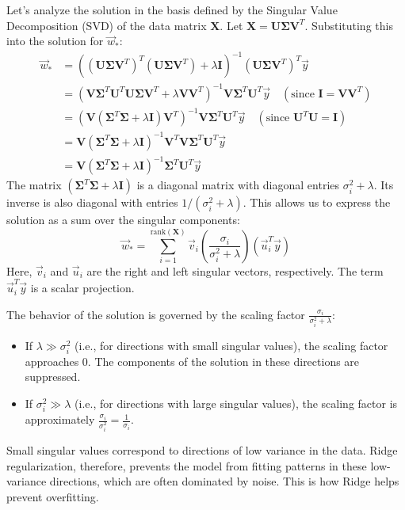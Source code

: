 \documentclass[11pt]{article}
\newcommand{\mat}[1]{\mathbf{#1}}
\begin{document}
Let's analyze the solution in the basis defined by the Singular Value Decomposition (SVD) of the data matrix $\mat{X}$. Let $\mat{X} = \mat{U} \mat{\Sigma} \mat{V}^T$. Substituting this into the solution for $\vec{w}_{*}$:
\begin{align*}
    \vec{w}_{*} &= ((\mat{U}\mat{\Sigma}\mat{V}^T)^T (\mat{U}\mat{\Sigma}\mat{V}^T) + \lambda \mat{I})^{-1} (\mat{U}\mat{\Sigma}\mat{V}^T)^T \vec{y} \\
    &= (\mat{V}\mat{\Sigma}^T\mat{U}^T \mat{U}\mat{\Sigma}\mat{V}^T + \lambda \mat{V}\mat{V}^T)^{-1} \mat{V}\mat{\Sigma}^T\mat{U}^T \vec{y} \quad (\text{since } \mat{I} = \mat{V}\mat{V}^T) \\
    &= (\mat{V}(\mat{\Sigma}^T\mat{\Sigma} + \lambda \mat{I})\mat{V}^T)^{-1} \mat{V}\mat{\Sigma}^T\mat{U}^T \vec{y} \quad (\text{since } \mat{U}^T\mat{U} = \mat{I}) \\
    &= \mat{V}(\mat{\Sigma}^T\mat{\Sigma} + \lambda \mat{I})^{-1}\mat{V}^T \mat{V}\mat{\Sigma}^T\mat{U}^T \vec{y} \\
    &= \mat{V}(\mat{\Sigma}^T\mat{\Sigma} + \lambda \mat{I})^{-1}\mat{\Sigma}^T\mat{U}^T \vec{y}
\end{align*}
The matrix $(\mat{\Sigma}^T\mat{\Sigma} + \lambda \mat{I})$ is a diagonal matrix with diagonal entries $\sigma_i^2 + \lambda$. Its inverse is also diagonal with entries $1/(\sigma_i^2 + \lambda)$. This allows us to express the solution as a sum over the singular components:
\begin{equation}
    \vec{w}_{*} = \sum_{i=1}^{\text{rank}(\mat{X})} \vec{v}_i \left( \frac{\sigma_i}{\sigma_i^2 + \lambda} \right) (\vec{u}_i^T \vec{y})
\end{equation}
Here, $\vec{v}_i$ and $\vec{u}_i$ are the right and left singular vectors, respectively. The term $\vec{u}_i^T \vec{y}$ is a scalar projection.

The behavior of the solution is governed by the scaling factor $\frac{\sigma_i}{\sigma_i^2 + \lambda}$:
\begin{itemize}
    \item If $\lambda \gg \sigma_i^2$ (i.e., for directions with small singular values), the scaling factor approaches 0. The components of the solution in these directions are suppressed.
    \item If $\sigma_i^2 \gg \lambda$ (i.e., for directions with large singular values), the scaling factor is approximately $\frac{\sigma_i}{\sigma_i^2} = \frac{1}{\sigma_i}$.
\end{itemize}
Small singular values correspond to directions of low variance in the data. Ridge regularization, therefore, prevents the model from fitting patterns in these low-variance directions, which are often dominated by noise. This is how Ridge helps prevent overfitting.
\end{document}
